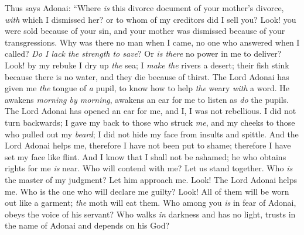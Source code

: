 \begin{biblechapter} %
\verse Thus says Adonai:
\verse “Where \textit{is} this divorce document of your mother’s divorce, \textit{with} which I dismissed her? 
or to whom of my creditors did I sell you? 
Look! you were sold because of your sin, 
and your mother was dismissed because of your transgressions.
\verse Why was there no man when I came, 
no one who answered when I called? 
\textit{Do I lack the strength to save}? 
Or \textit{is there} no power in me to deliver? 
Look! by my rebuke I dry up \textit{the} sea; 
I \textit{make} \textit{the} rivers a desert; 
their fish stink because there is no water, 
and they die because of thirst.
 The Lord Adonai has given me \textit{the} tongue of \textit{a} pupil, 
to know how to help \textit{the} weary \textit{with} a word. 
He awakens \textit{morning by morning}, 
awakens an ear for me to listen as \textit{do} the pupils.
\verse The Lord Adonai has opened an ear for me, 
and I, I was not rebellious. 
I did not turn backwards;
\verse I gave my back to those who struck \textit{me}, 
and my cheeks to those who pulled out my \textit{beard}; 
I did not hide my face from insults and spittle.
\verse And the Lord Adonai helps me,
\verse therefore I have not been put to shame; 
therefore I have set my face like flint. 
And I know that I shall not be ashamed;
\verse he who obtains rights for me \textit{is} near. 
Who will contend with me? Let us stand together. 
Who \textit{is} the master of my judgment? Let him approach me.
\verse Look! The Lord Adonai helps me. 
Who is the one who will declare me guilty? 
Look! All of them will be worn out like a garment; 
\textit{the} moth will eat them.
\verse Who among you \textit{is} in fear of Adonai, 
obeys the voice of his servant? 
Who walks \textit{in} darkness 
and has no light, 
trusts in the name of Adonai 
and depends on his God?
\end{biblechapter}

